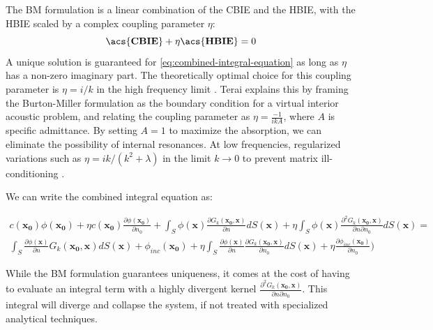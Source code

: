 The \ac{BM} formulation is a linear combination of the \ac{CBIE} and the \ac{HBIE}, with the \ac{HBIE} scaled by a complex coupling parameter $\eta$:
\begin{equation} \label{eq:combined-integral-equation}
    \mathbf{\acs{CBIE}} + \eta \mathbf{\acs{HBIE}} = 0
\end{equation}
A unique solution is guaranteed for \eqref{eq:combined-integral-equation} as long as $\eta$ has a non-zero imaginary part. 
The theoretically optimal choice for this  coupling parameter is $\eta = i/k$  in the high frequency limit \cite{chappellchoicecouplingparameter2009}. 
Terai\cite{teraicalculationsoundfields} explains this by framing the Burton-Miller formulation as the boundary condition for a virtual interior acoustic problem, and relating the coupling parameter as $\eta = \frac{-1}{i k A}$, where $A$ is specific admittance. 
By setting $A = 1$ to maximize the absorption, we can eliminate the possibility of internal resonances. 
At low frequencies, regularized variations such as $\eta = i k / \left( k^2 + \lambda \right) $ in the limit $ k \to 0$ to prevent matrix ill-conditioning \cite{marburgburtonmillermethod2016}.

We can write the combined integral equation as:

\begin{multline} \label{eq:bm-cbie-expanded}
    c(\mathbf{x_0})\phi(\mathbf{x_0}) + \eta c(\mathbf{x_0})\frac{\partial \phi(\mathbf{x_0})}{\partial n_0} + \int_S \phi(\mathbf{x}) \frac{\partial G_k(\mathbf{x_0}, \mathbf{x})}{\partial n} dS(\mathbf{x}) + \eta \int_S \phi(\mathbf{x}) \frac{\partial^2 G_k(\mathbf{x_0}, \mathbf{x})}{\partial n \partial n_0} dS(\mathbf{x}) = \\ \int_S \frac{\partial \phi(\mathbf{x})}{\partial n} G_k(\mathbf{x_0}, \mathbf{x}) dS(\mathbf{x}) + \phi_{inc}(\mathbf{x_0}) + \eta \int_S \frac{\partial \phi(\mathbf{x})}{\partial n} \frac{\partial G_k(\mathbf{x_0}, \mathbf{x})}{\partial n_0} dS(\mathbf{x}) + \eta \frac{\partial \phi_{inc}(\mathbf{x_0})}{\partial n_0})
\end{multline}

While the \ac{BM} formulation guarantees uniqueness, it comes at the cost of having to evaluate an integral term with a highly divergent kernel $\frac{\partial^2 G_k(\mathbf{x_0}, \mathbf{x})}{\partial n \partial n_0}$. 
This integral will diverge and collapse the system, if not treated with specialized analytical techniques. 

